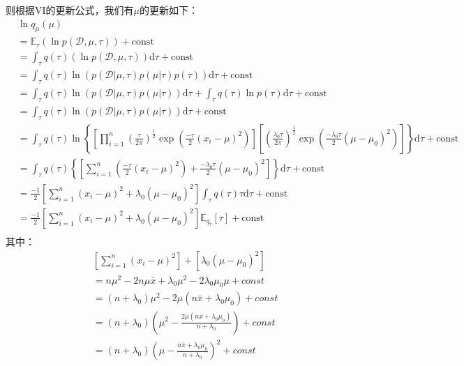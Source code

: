 则根据VI的更新公式，我们有$\mu$的更新如下：
\begin{displaymath}
\begin{split}
&\ln{q_\mu(\mu)}\\
&=\mathbb{E}_{\tau}(\ln p(\mathcal{D}, \mu, \tau)) + \text{const}\\
&=\int_{\tau} q(\tau) (\ln p(\mathcal{D}, \mu, \tau))  \mathrm{d} \tau + \text{const}\\
&=\int_{\tau} q(\tau) \ln (  p(\mathcal{D} | \mu, \tau) p(\mu|\tau) p(\tau))  \mathrm{d} \tau + \text{const} \\
&=\int_{\tau} q(\tau) \ln (  p(\mathcal{D} | \mu, \tau) p(\mu|\tau))  \mathrm{d} \tau +\int_{\tau} q(\tau) \ln p(\tau)   \mathrm{d} \tau +  \text{const}\\
&=\int_{\tau} q(\tau) \ln (  p(\mathcal{D} | \mu, \tau) p(\mu|\tau))  \mathrm{d} \tau +  \text{const}\\
&=\int_{\tau} q(\tau) \ln \left \{ 
\left [ \prod_{i=1}^{n} \left ( \frac{\tau}{2 \pi} \right )^{\frac{1}{2}}  \exp \left ( \frac{-\tau}{2} (x_i - \mu)^2 \right ) \right ]
\left [ \left ( \frac{\lambda_0 \tau}{2 \pi} \right )^{\frac{1}{2}}  \exp \left ( \frac{-\lambda_0 \tau}{2} ( \mu - \mu_0)^2 \right ) \right ]
\right \}  \mathrm{d} \tau +  \text{const}\\
&=\int_{\tau} q(\tau)  \left \{ 
\left [ \sum_{i=1}^{n} \left ( \frac{-\tau}{2} (x_i - \mu)^2 \right ) +
\frac{-\lambda_0 \tau}{2} ( \mu - \mu_0)^2 \right ]
\right \}  \mathrm{d} \tau +  \text{const}\\
&=   \frac{-1}{2} 
\left [ \sum_{i=1}^{n} (x_i - \mu)^2 +
\lambda_0 ( \mu - \mu_0)^2 \right ]
\int_{\tau} q(\tau) \tau  \mathrm{d} \tau +  \text{const}\\
&=   \frac{-1}{2} 
\left [ \sum_{i=1}^{n} (x_i - \mu)^2 +
\lambda_0 ( \mu - \mu_0)^2 \right ]
\mathbb{E}_{q_\tau} [\tau] +  \text{const}\\
\end{split}
\end{displaymath}
其中：
\begin{displaymath}
\begin{split}
&\left [ \sum_{i=1}^{n} (x_i - \mu)^2  \right ]  + \left [ \lambda_0 ( \mu - \mu_0)^2 \right ]\\
&= n \mu^2 -2n\mu\bar{x} + \lambda_0 \mu^2 - 2\lambda_0\mu_0\mu + const \\
&= (n+\lambda_0)\mu^2 -2 \mu (n\bar{x}+\lambda_0\mu_0) + const\\
&= (n+\lambda_0) \left( \mu ^2 - \frac{2 \mu (n\bar{x}+\lambda_0\mu_0)}{n+\lambda_0} \right) +const\\
&= (n+\lambda_0) \left( \mu - \frac{n\bar{x}+\lambda_0\mu_0}{n+\lambda_0} \right) ^2 + const\\
\end{split}
\end{displaymath}
